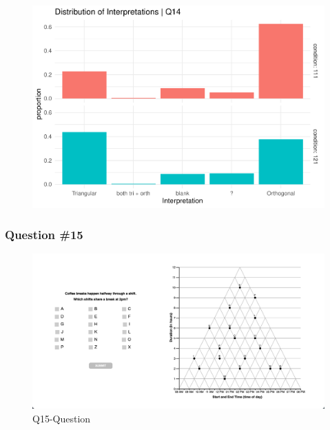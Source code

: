 \documentclass[
  letterpaper,
  DIV=11,
  numbers=noendperiod]{scrreprt}
\begin{document}
\begin{figure}[H]

{\centering \includegraphics{analysis/SGC3A/2_sgc3A_scoring_files/figure-pdf/Q14-distribution-2.pdf}

}

\end{figure}

\hypertarget{question-15}{%
\subsubsection{Question \#15}\label{question-15}}

\begin{figure}

{\centering \includegraphics{analysis/SGC3A/static/questions/Q15.png}

}

\caption{\label{fig-Q15}Q15-Question}

\end{figure}
\end{document}
